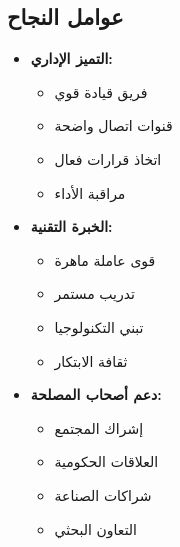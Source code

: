 \subsection{عوامل النجاح}
\begin{itemize}
    \item \textbf{التميز الإداري:}
    \begin{itemize}
        \item فريق قيادة قوي
        \item قنوات اتصال واضحة
        \item اتخاذ قرارات فعال
        \item مراقبة الأداء
    \end{itemize}
    
    \item \textbf{الخبرة التقنية:}
    \begin{itemize}
        \item قوى عاملة ماهرة
        \item تدريب مستمر
        \item تبني التكنولوجيا
        \item ثقافة الابتكار
    \end{itemize}
    
    \item \textbf{دعم أصحاب المصلحة:}
    \begin{itemize}
        \item إشراك المجتمع
        \item العلاقات الحكومية
        \item شراكات الصناعة
        \item التعاون البحثي
    \end{itemize}
\end{itemize} 
